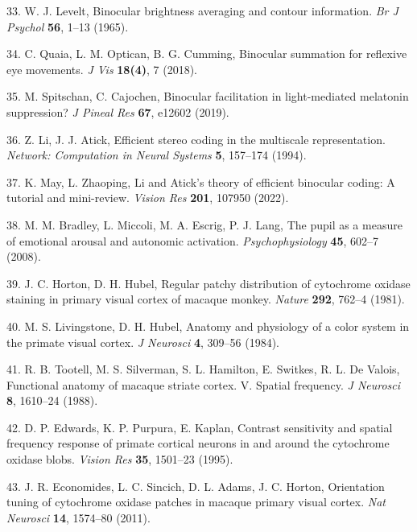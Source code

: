 \documentclass[
]{article}
\begin{document}
\leavevmode\hypertarget{ref-Levelt1965}{}%
33. W. J. Levelt, Binocular brightness averaging and contour information. \emph{Br J Psychol} \textbf{56}, 1--13 (1965).

\leavevmode\hypertarget{ref-Quaia2018}{}%
34. C. Quaia, L. M. Optican, B. G. Cumming, Binocular summation for reflexive eye movements. \emph{J Vis} \textbf{18(4)}, 7 (2018).

\leavevmode\hypertarget{ref-Spitschan2019}{}%
35. M. Spitschan, C. Cajochen, Binocular facilitation in light-mediated melatonin suppression? \emph{J Pineal Res} \textbf{67}, e12602 (2019).

\leavevmode\hypertarget{ref-Li1994}{}%
36. Z. Li, J. J. Atick, Efficient stereo coding in the multiscale representation. \emph{Network: Computation in Neural Systems} \textbf{5}, 157--174 (1994).

\leavevmode\hypertarget{ref-May2022}{}%
37. K. May, L. Zhaoping, Li and Atick's theory of efficient binocular coding: A tutorial and mini-review. \emph{Vision Res} \textbf{201}, 107950 (2022).

\leavevmode\hypertarget{ref-Bradley2008}{}%
38. M. M. Bradley, L. Miccoli, M. A. Escrig, P. J. Lang, The pupil as a measure of emotional arousal and autonomic activation. \emph{Psychophysiology} \textbf{45}, 602--7 (2008).

\leavevmode\hypertarget{ref-Horton1981}{}%
39. J. C. Horton, D. H. Hubel, Regular patchy distribution of cytochrome oxidase staining in primary visual cortex of macaque monkey. \emph{Nature} \textbf{292}, 762--4 (1981).

\leavevmode\hypertarget{ref-Livingstone1984}{}%
40. M. S. Livingstone, D. H. Hubel, Anatomy and physiology of a color system in the primate visual cortex. \emph{J Neurosci} \textbf{4}, 309--56 (1984).

\leavevmode\hypertarget{ref-Tootell1988}{}%
41. R. B. Tootell, M. S. Silverman, S. L. Hamilton, E. Switkes, R. L. De Valois, Functional anatomy of macaque striate cortex. V. Spatial frequency. \emph{J Neurosci} \textbf{8}, 1610--24 (1988).

\leavevmode\hypertarget{ref-Edwards1995}{}%
42. D. P. Edwards, K. P. Purpura, E. Kaplan, Contrast sensitivity and spatial frequency response of primate cortical neurons in and around the cytochrome oxidase blobs. \emph{Vision Res} \textbf{35}, 1501--23 (1995).

\leavevmode\hypertarget{ref-Economides2011}{}%
43. J. R. Economides, L. C. Sincich, D. L. Adams, J. C. Horton, Orientation tuning of cytochrome oxidase patches in macaque primary visual cortex. \emph{Nat Neurosci} \textbf{14}, 1574--80 (2011).
\end{document}
